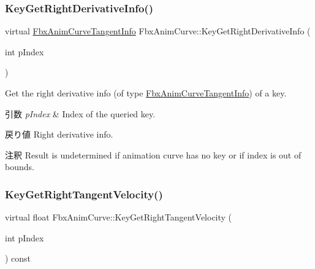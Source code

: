 \subsubsection{\texorpdfstring{Key\+Get\+Right\+Derivative\+Info()}{KeyGetRightDerivativeInfo()}}
{\footnotesize\ttfamily virtual \hyperlink{struct_fbx_anim_curve_tangent_info}{Fbx\+Anim\+Curve\+Tangent\+Info} Fbx\+Anim\+Curve\+::\+Key\+Get\+Right\+Derivative\+Info (\begin{DoxyParamCaption}\item[{int}]{p\+Index }\end{DoxyParamCaption})\hspace{0.3cm}{\ttfamily [pure virtual]}}

Get the right derivative info (of type \hyperlink{struct_fbx_anim_curve_tangent_info}{Fbx\+Anim\+Curve\+Tangent\+Info}) of a key. 
\begin{DoxyParams}{引数}
{\em p\+Index} & Index of the queried key. \\
\hline
\end{DoxyParams}
\begin{DoxyReturn}{戻り値}
Right derivative info. 
\end{DoxyReturn}
\begin{DoxyRemark}{注釈}
Result is undetermined if animation curve has no key or if index is out of bounds. 
\end{DoxyRemark}
\mbox{\label{class_fbx_anim_curve_a85a44ed49cc90f3c7dc53ca5da5107b3}} 
\subsubsection{\texorpdfstring{Key\+Get\+Right\+Tangent\+Velocity()}{KeyGetRightTangentVelocity()}}
{\footnotesize\ttfamily virtual float Fbx\+Anim\+Curve\+::\+Key\+Get\+Right\+Tangent\+Velocity (\begin{DoxyParamCaption}\item[{int}]{p\+Index }\end{DoxyParamCaption}) const\hspace{0.3cm}{\ttfamily [pure virtual]}}

